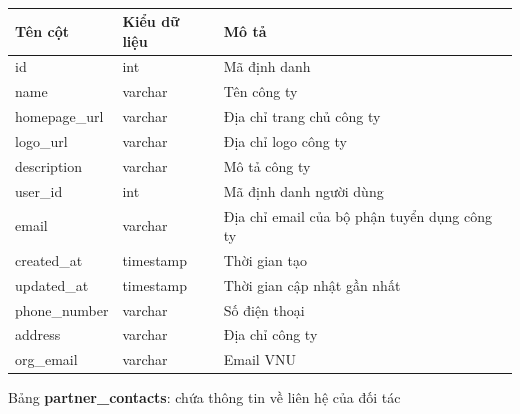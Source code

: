 \documentclass[./../main.tex]{subfiles}
\begin{document}
\begin{table}[H]
	\caption{}
	\label{tab:db_partners}
	\begin{tabularx}{\textwidth}{|l|l|X|}
	\hline
	\textbf{Tên cột} & \textbf{Kiểu dữ liệu} & \textbf{Mô tả}                               \\ \hline
	id               & int                   & Mã định danh                                 \\ \hline
	name             & varchar               & Tên công ty                                  \\ \hline
	homepage\_url    & varchar               & Địa chỉ trang chủ công ty                    \\ \hline
	logo\_url        & varchar               & Địa chỉ logo công ty                         \\ \hline
	description      & varchar               & Mô tả công ty                                \\ \hline
	user\_id         & int                   & Mã định danh người dùng                      \\ \hline
	email            & varchar               & Địa chỉ email của bộ phận tuyển dụng công ty \\ \hline
	created\_at      & timestamp             & Thời gian tạo                                \\ \hline
	updated\_at      & timestamp             & Thời gian cập nhật gần nhất                  \\ \hline
	phone\_number    & varchar               & Số điện thoại                                \\ \hline
	address          & varchar               & Địa chỉ công ty                              \\ \hline
	org\_email       & varchar               & Email VNU                                    \\ \hline
	\end{tabularx}
\end{table}

Bảng \textbf{partner\_contacts}: chứa thông tin về liên hệ của đối tác
\end{document}
